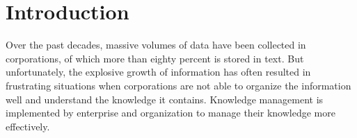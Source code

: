 \documentclass{elsarticle}
\begin{document}
\section{Introduction}
\label{sec:introduction}

Over the past decades, massive volumes of data have been collected in corporations, of which more than eighty percent is stored in text. But unfortunately, the explosive growth of information has often resulted in frustrating situations when corporations are not able to organize the information well and understand the knowledge it contains. Knowledge management is implemented by enterprise and organization to manage their knowledge more effectively. 
\end{document}
